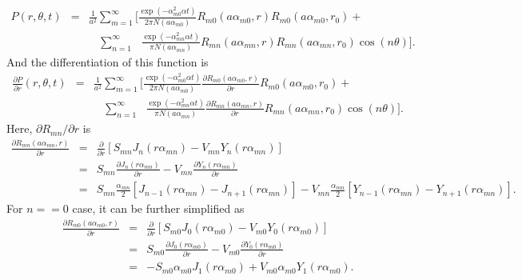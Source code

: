 \documentclass{article}
\begin{document}
\begin{eqnarray}
    P(r, \theta, t) &=&
    \frac{1}{a^2} \sum_{m=1}^{\infty} \Bigg[
    \frac{\exp(-\alpha_{m0}^2\alpha t)}{2\pi N(a\alpha_{m0})}
    R_{m0}(a\alpha_{m0}, r) R_{m0}(a\alpha_{m0}, r_0) +
\nonumber\\
    & &\ \ \ \ \sum_{n=1}^{\infty}\ \ \ 
    \frac{\exp(-\alpha_{mn}^2\alpha t)}{\pi N(a\alpha_{mn})}
    R_{mn}(a\alpha_{mn}, r) R_{mn}(a\alpha_{mn}, r_0)\cos(n\theta)\Bigg].
\end{eqnarray}
%
And the differentiation of this function is
%
\begin{eqnarray}
    \frac{\partial P}{\partial r}(r, \theta, t) &=&
    \frac{1}{a^2} \sum_{m=1}^{\infty} \Bigg[
    \frac{\exp(-\alpha_{m0}^2\alpha t)}{2\pi N(a\alpha_{m0})}
    \frac{\partial R_{m0}(a\alpha_{m0}, r)}{\partial r} R_{m0}(a\alpha_{m0}, r_0) +
\nonumber\\
    & &\ \ \ \ \sum_{n=1}^{\infty}\ \ \ 
    \frac{\exp(-\alpha_{mn}^2\alpha t)}{\pi N(a\alpha_{mn})}
    \frac{\partial R_{mn}(a\alpha_{mn}, r)}{\partial r} R_{mn}(a\alpha_{mn}, r_0)\cos(n\theta)\Bigg].
\end{eqnarray}
%
Here, $\partial R_{mn} / \partial r$ is
%
\begin{eqnarray}
        \frac{\partial R_{mn}(a\alpha_{mn}, r)}{\partial r}
    &=& \frac{\partial }{\partial r} \left[
        S_{mn}J_n(r\alpha_{mn}) - V_{mn}Y_n(r\alpha_{mn})
        \right]
\nonumber \\
    &=& S_{mn}\frac{\partial J_n(r\alpha_{mn})}{\partial r} -
        V_{mn}\frac{\partial Y_n(r\alpha_{mn})}{\partial r}
\nonumber \\
    &=& S_{mn}\frac{\alpha_{mn}}{2}\left[J_{n-1}(r\alpha_{mn}) - J_{n+1}(r\alpha_{mn})\right] -
        V_{mn}\frac{\alpha_{mn}}{2}\left[Y_{n-1}(r\alpha_{mn}) - Y_{n+1}(r\alpha_{mn})\right].
\end{eqnarray}
%
For $n == 0$ case, it can be further simplified as
%
\begin{eqnarray}
        \frac{\partial R_{m0}(a\alpha_{m0}, r)}{\partial r}
    &=& \frac{\partial }{\partial r} \left[
        S_{m0}J_0(r\alpha_{m0}) - V_{m0}Y_0(r\alpha_{m0})
        \right]
\nonumber \\
    &=& S_{m0}\frac{\partial J_0(r\alpha_{m0})}{\partial r} -
        V_{m0}\frac{\partial Y_0(r\alpha_{m0})}{\partial r}
\nonumber \\
    &=& -S_{m0}\alpha_{m0}J_1(r\alpha_{m0}) +
         V_{m0}\alpha_{m0}Y_1(r\alpha_{m0}).
\end{eqnarray}
\end{document}
